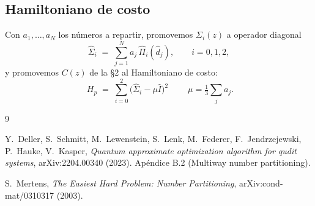 \documentclass[11pt]{article}
\newcommand{\op}[1]{\hat{#1}}
\begin{document}
\subsection{Hamiltoniano de costo}

Con $a_1,\dots,a_N$ los n\'umeros a repartir, promovemos $\Sigma_i(z)$ a
operador diagonal
\[
  \op\Sigma_i \;=\; \sum_{j=1}^{N} a_j\, \op\Pi_i(\op{d}_j),
  \qquad i = 0,1,2,
\]
y promovemos $C(z)$ de la \S2 al Hamiltoniano de costo:
\[
  \boxed{\;H_p \;=\; \sum_{i=0}^{2} \big(\op\Sigma_i - \mu\op{I}\big)^2\;}
  \qquad \mu = \tfrac13\sum_j a_j .
\]

\begin{thebibliography}{9}

Y.~Deller, S.~Schmitt, M.~Lewenstein, S.~Lenk, M.~Federer,
F.~Jendrzejewski, P.~Hauke, V.~Kasper, \emph{Quantum approximate
optimization algorithm for qudit systems}, arXiv:2204.00340 (2023).
Ap\'endice B.2 (Multiway number partitioning).

S.~Mertens, \emph{The Easiest Hard Problem: Number
Partitioning}, arXiv:cond-mat/0310317 (2003).

\end{thebibliography}
\end{document}
